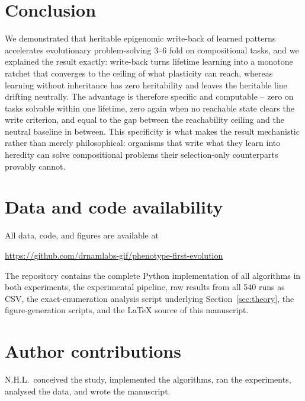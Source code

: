 \documentclass[11pt]{article}
\begin{document}
\section{Conclusion}

We demonstrated that heritable epigenomic write-back of learned patterns
accelerates evolutionary problem-solving 3--6 fold on compositional tasks,
and we explained the result exactly: write-back turns lifetime learning into
a monotone ratchet that converges to the ceiling of what plasticity can
reach, whereas learning without inheritance has zero heritability and leaves
the heritable line drifting neutrally. The advantage is therefore specific
and computable -- zero on tasks solvable within one lifetime, zero again when
no reachable state clears the write criterion, and equal to the gap between
the reachability ceiling and the neutral baseline in between. This
specificity is what makes the result mechanistic rather than merely
philosophical: organisms that write what they learn into heredity can solve
compositional problems their selection-only counterparts provably cannot.

\section*{Data and code availability}

All data, code, and figures are available at
\begin{center}
\url{https://github.com/drnamlabs-gif/phenotype-first-evolution}
\end{center}
\noindent
The repository contains the complete Python implementation of all algorithms
in both experiments, the experimental pipeline, raw results from all 540 runs
as CSV, the exact-enumeration analysis script underlying
Section~\ref{sec:theory}, the figure-generation scripts, and the LaTeX source
of this manuscript.

\section*{Author contributions}

N.H.L.\ conceived the study, implemented the algorithms, ran the experiments,
analysed the data, and wrote the manuscript.


\end{document}
